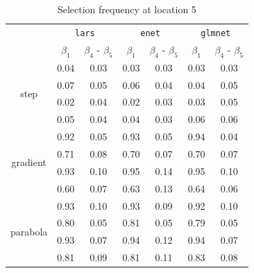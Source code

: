 \documentclass[authoryear, review, 11pt]{elsarticle}
\begin{document}
		\begin{table}[ht]
		\begin{center}
		\begin{tabular}{ccc|cc|cc}
		& \multicolumn{2}{c}{\texttt{lars}} & \multicolumn{2}{c}{\texttt{enet}} & \multicolumn{2}{c}{\texttt{glmnet}} \\
		& $\beta_1$ & $\beta_4$ - $\beta_5$ & $\beta_1$ & $\beta_4$ - $\beta_5$ & $\beta_1$ & $\beta_4$ - $\beta_5$ \\ 
		  \cline{2-7}
		  \multirow{4}{*}{step} & 0.04 & 0.03 & 0.03 & 0.03 & 0.03 & 0.03 \\ 
		  & 0.07 & 0.05 & 0.06 & 0.04 & 0.04 & 0.05 \\ 
		  & 0.02 & 0.04 & 0.02 & 0.03 & 0.03 & 0.05 \\ 
		  & 0.05 & 0.04 & 0.04 & 0.03 & 0.06 & 0.06 \\ 
		  \cline{2-7}
		  \multirow{4}{*}{gradient} & 0.92 & 0.05 & 0.93 & 0.05 & 0.94 & 0.04 \\ 
		  & 0.71 & 0.08 & 0.70 & 0.07 & 0.70 & 0.07 \\ 
		  & 0.93 & 0.10 & 0.95 & 0.14 & 0.95 & 0.10 \\ 
		  & 0.60 & 0.07 & 0.63 & 0.13 & 0.64 & 0.06 \\ 
		  \cline{2-7}
		  \multirow{4}{*}{parabola} & 0.93 & 0.10 & 0.93 & 0.09 & 0.92 & 0.10 \\ 
		  & 0.80 & 0.05 & 0.81 & 0.05 & 0.79 & 0.05 \\ 
		  & 0.93 & 0.07 & 0.94 & 0.12 & 0.94 & 0.07 \\ 
		  & 0.81 & 0.09 & 0.81 & 0.11 & 0.83 & 0.08 \\ 
		  \end{tabular}
		\caption{Selection frequency at location 5\label{table:loc5-selection}}
		\end{center}
		\end{table}
		
\end{document}
